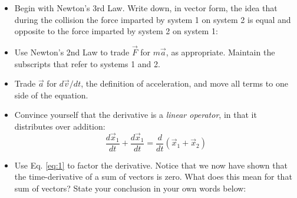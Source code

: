 \documentclass{article}
\begin{document}
\begin{itemize}
\item Begin with Newton's 3rd Law.  Write down, in vector form, the idea that during the collision the force imparted by system 1 on system 2 is equal and opposite to the force imparted by system 2 on system 1: \\ \vspace{0.5cm}
\item Use Newton's 2nd Law to trade $\vec{F}$ for $m\vec{a}$, as appropriate.  Maintain the subscripts that refer to systems 1 and 2. \\ \vspace{0.5cm}
\item Trade $\vec{a}$ for $d\vec{v}/dt$, the definition of acceleration, and move all terms to one side of the equation. \\ \vspace{0.5cm}
\item Convince yourself that the derivative is a \textit{linear operator}, in that it distributes over addition:
\begin{equation}
\frac{d\vec{x}_1}{dt} + \frac{d\vec{x}_1}{dt} = \frac{d}{dt}\left(\vec{x}_1 + \vec{x}_2\right) \label{eq:1}
\end{equation}
\item Use Eq. \ref{eq:1} to factor the derivative.  Notice that we now have shown that the time-derivative of a sum of vectors is zero.  What does this mean for that sum of vectors?  State your conclusion in your own words below:
\end{itemize}
\end{document}
